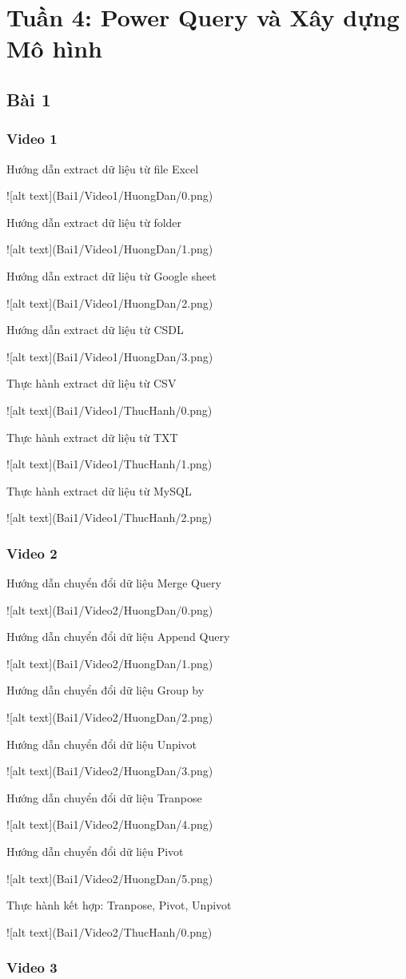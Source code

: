 \documentclass{article}
\begin{document}
\tableofcontents
\newpage
\listoffigures
\newpage
\section{Tuần 4: Power Query và Xây dựng Mô hình}
\subsection{Bài 1}
\subsubsection{Video 1}

\caption{Hướng dẫn extract dữ liệu từ file Excel}
![alt text](Bai1/Video1/HuongDan/0.png)
\caption{Hướng dẫn extract dữ liệu từ folder}
![alt text](Bai1/Video1/HuongDan/1.png)
\caption{Hướng dẫn extract dữ liệu từ Google sheet}
![alt text](Bai1/Video1/HuongDan/2.png)
\caption{Hướng dẫn extract dữ liệu từ CSDL}
![alt text](Bai1/Video1/HuongDan/3.png)

\caption{Thực hành extract dữ liệu từ CSV}
![alt text](Bai1/Video1/ThucHanh/0.png)
\caption{Thực hành extract dữ liệu từ TXT}
![alt text](Bai1/Video1/ThucHanh/1.png)
\caption{Thực hành extract dữ liệu từ MySQL}
![alt text](Bai1/Video1/ThucHanh/2.png)
\subsubsection{Video 2}

\caption{Hướng dẫn chuyển đổi dữ liệu Merge Query}
![alt text](Bai1/Video2/HuongDan/0.png)
\caption{Hướng dẫn chuyển đổi dữ liệu Append Query}
![alt text](Bai1/Video2/HuongDan/1.png)
\caption{Hướng dẫn chuyển đổi dữ liệu Group by}
![alt text](Bai1/Video2/HuongDan/2.png)
\caption{Hướng dẫn chuyển đổi dữ liệu Unpivot}
![alt text](Bai1/Video2/HuongDan/3.png)
\caption{Hướng dẫn chuyển đổi dữ liệu Tranpose}
![alt text](Bai1/Video2/HuongDan/4.png)
\caption{Hướng dẫn chuyển đổi dữ liệu Pivot}
![alt text](Bai1/Video2/HuongDan/5.png)

\caption{Thực hành kết hợp: Tranpose, Pivot, Unpivot}
![alt text](Bai1/Video2/ThucHanh/0.png)
\subsubsection{Video 3}
\end{document}
